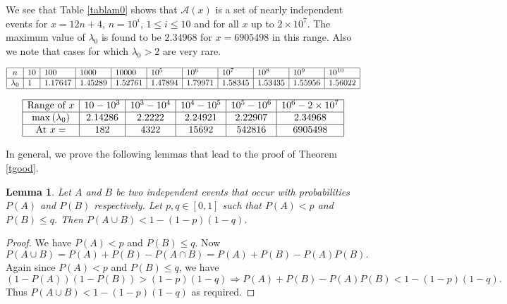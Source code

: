 \documentclass[11pt]{article}
\newtheorem{lemma}[theorem]{Lemma}
\theoremstyle{definition}
\theoremstyle{remark}
\numberwithin{equation}{section}
\begin{document}
\noindent
We see that Table \ref{tablam0} shows that $\mathscr{A}(x)$ is a set of nearly independent events for $x=12n+4$, $n=10^i$, $1\leq i\leq 10$ and for all $x$ up to $2\times 10^7$. The maximum value of $\lambda_0$ is found to be $2.34968$ for $x=6905498$ in this range. Also we note that cases for which $\lambda_0>2$ are very rare.

\begin{table}[ht]
$$\begin{array}{|c|l|l|l|l|l|l|l|l|l|l|}
\hline
n & 10 & 100 & 1000 & 10000 & 10^5 & 10^6 & 10^7 & 10^8 & 10^9 & 10^{10}\\
\hline
\lambda_0 & 1 & 1.17647 & 1.45289 & 1.52761 & 1.47894 & 1.79971 & 1.58345 & 1.53435 & 1.55956 & 1.56022\\
\hline
\end{array}$$
\caption{Values of $\lambda_0$ for $x=12n+4$ for $n=10$ to $n=10^{10}$.}\label{tablam0}
\end{table}

\begin{table}[ht]
$$\begin{array}{|c|c|c|c|c|c|}
\hline
\text{Range of }x & 10 - 10^3 & 10^3 - 10^4 & 10^4 - 10^5 & 10^5 - 10^6 & 10^6 - 2\times 10^7\\
\hline
\max\,(\lambda_0) & 2.14286 & 2.2222 & 2.24921 & 2.22907 & 2.34968\\
\hline
\text{At }x=& 182 & 4322 & 15692 & 542816 & 6905498\\
\hline
\end{array}$$
\caption{Maximum values of $\lambda_0$ for various ranges of $x$.}\label{tablamx}
\end{table}

\vspace{1em}
\noindent
In general, we prove the following lemmas that lead to the proof of Theorem \ref{tgood}.

\begin{lemma}\label{lemins}
Let $A$ and $B$ be two independent events that occur with probabilities $P(A)$ and $P(B)$ respectively. Let $p,q\in [0,1]$ such that $P(A)<p$ and $P(B)\leq q$. Then $P(A\cup B)<1 - (1 - p) (1 -q)$.
\end{lemma}

\begin{proof}
We have $P(A)<p$ and $P(B)\leq q$. Now 
$$P(A\cup B)=P(A)+P(B)-P(A\cap B)=P(A)+P(B)-P(A)P(B).$$
Again since $P(A)<p$ and $P(B)\leq q$, we have 
$$(1-P(A))(1-P(B))>(1-p)(1-q)\Longrightarrow P(A)+P(B)-P(A)P(B)<1-(1-p)(1-q).$$
Thus $P(A\cup B)<1-(1-p)(1-q)$ as required.
\end{proof}
\end{document}

